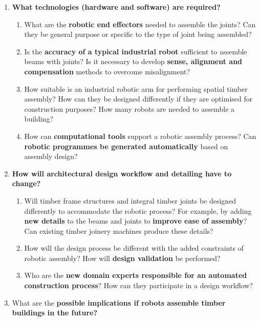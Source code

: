\begin{enumerate}
	\item \textbf{What technologies (hardware and software) are required?}

\begin{enumerate}
	\item What are the \textbf{robotic end effectors} needed to assemble the joints? Can they be general purpose or specific to the type of joint being assembled?

	\item Is the \textbf{accuracy of a typical industrial robot }sufficient to assemble beams with joints? Is it necessary to develop \textbf{sense, alignment and compensation }methods to overcome misalignment?

	\item How suitable is an industrial robotic arm for performing spatial timber assembly? How can they be designed differently if they are optimised for construction purposes? How many robots are needed to assemble a building?

	\item How can \textbf{computational tools }support a robotic assembly process? Can \textbf{robotic programmes be generated automatically} based on assembly design?

\end{enumerate}
	\item \textbf{How will architectural design workflow and detailing have to change?}

\begin{enumerate}
	\item Will timber frame structures and integral timber joints be designed differently to accommodate the robotic process? For example, by adding \textbf{new details }to the beams and joints to \textbf{improve ease of assembly}? Can existing timber joinery machines produce these details?

	\item How will the design process be different with the added constraints of robotic assembly? How will \textbf{design validation }be performed?

	\item Who are the \textbf{new domain experts responsible for an automated construction process}? How can they participate in a design workflow?

\end{enumerate}
	\item What are the \textbf{possible implications if robots assemble timber buildings in the future?}


\end{enumerate}
